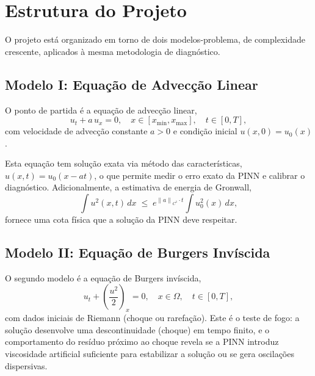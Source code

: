 \documentclass[12pt, a4paper]{article}
\theoremstyle{definition}
\newcommand{\norm}[1]{\left\lVert #1 \right\rVert}
\begin{document}
\section{Estrutura do Projeto}

O projeto está organizado em torno de dois modelos-problema, de complexidade crescente,
aplicados à mesma metodologia de diagnóstico.

\subsection{Modelo I: Equação de Advecção Linear}

O ponto de partida é a equação de advecção linear,
\begin{equation}
    u_t + a\,u_x = 0, \quad x \in [x_{\min}, x_{\max}],\quad t \in [0, T],
    \label{eq:adveccao}
\end{equation}
com velocidade de advecção constante $a > 0$ e condição inicial $u(x, 0) = u_0(x)$.

Esta equação tem solução exata via método das características, $u(x,t) = u_0(x - at)$,
o que permite medir o erro exato da PINN e calibrar o diagnóstico. Adicionalmente, a
estimativa de energia de Gronwall,
\begin{equation}
    \int u^2(x,t)\,dx \;\leq\; e^{\norm{a}_{C^1} \cdot t} \int u_0^2(x)\,dx,
    \label{eq:gronwall}
\end{equation}
fornece uma cota física que a solução da PINN deve respeitar.

\subsection{Modelo II: Equação de Burgers Invíscida}

O segundo modelo é a equação de Burgers invíscida,
\begin{equation}
    u_t + \left(\frac{u^2}{2}\right)_x = 0, \quad x \in \Omega,\quad t \in [0, T],
    \label{eq:burgers}
\end{equation}
com dados iniciais de Riemann (choque ou rarefação). Este é o teste de fogo: a
solução desenvolve uma descontinuidade (choque) em tempo finito, e o comportamento
do resíduo próximo ao choque revela se a PINN introduz viscosidade artificial
suficiente para estabilizar a solução ou se gera oscilações dispersivas.
\end{document}
